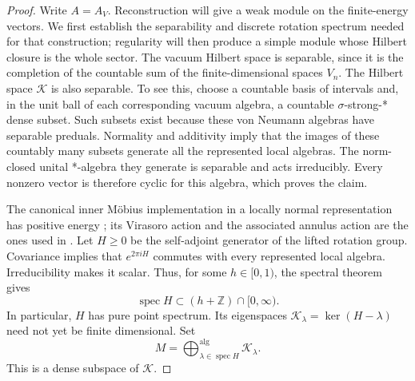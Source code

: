 \begin{proof}
Write \(A=A_V\).  Reconstruction will give a weak module on the finite-energy vectors.
We first establish the separability and discrete rotation spectrum
needed for that construction; regularity will then produce a simple
module whose Hilbert closure is the whole sector.  The vacuum Hilbert space is separable, since it is
the completion of the countable sum of the finite-dimensional spaces
\(V_n\).  The Hilbert space \(\mathcal K\) is also separable.  To see this,
choose a countable basis of intervals and, in the unit ball of each
corresponding vacuum algebra, a countable \(\sigma\)-strong-* dense subset.
Such subsets exist because these von Neumann algebras have separable
preduals.  Normality and additivity imply that the images of these countably
many subsets generate all the represented local algebras.  The norm-closed
unital *-algebra they generate is separable and acts irreducibly.  Every
nonzero vector is therefore cyclic for this algebra, which proves the claim.

The canonical inner M\"obius implementation in a locally normal
representation has positive energy
\cite[Theorem~3.8]{Weiner}; its Virasoro action and the associated annulus
action are the ones used in \cite[Sections~2, 4 and 9]{HTVOA}.
Let \(H\geq0\) be the self-adjoint generator of the lifted rotation group.
Covariance implies that \(e^{2\pi iH}\) commutes with every represented
local algebra.  Irreducibility makes it scalar.  Thus, for some
\(h\in[0,1)\), the spectral theorem gives
\[
  \operatorname{spec}H\subset (h+\mathbb Z)\cap[0,\infty).
\]
In particular, \(H\) has pure point spectrum.  Its eigenspaces
\(\mathcal K_\lambda=\ker(H-\lambda)\) need not yet be finite dimensional.
Set
\[
  M=\bigoplus_{\lambda\in\operatorname{spec}H}^{\mathrm{alg}}
        \mathcal K_\lambda.
\]
This is a dense subspace of \(\mathcal K\).


\end{proof}
